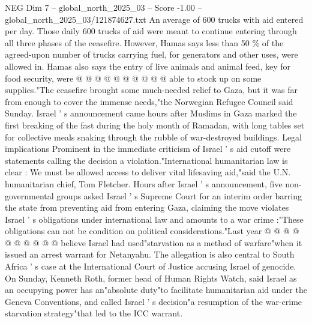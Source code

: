 \begin{textsample}{NEG Dim 7 – global\_north\_2025\_03 – Score -1.00 – global\_north\_2025\_03/121874627.txt}
An average of 600 trucks with aid entered per day.
Those daily 600 trucks of aid were meant to continue entering through all three phases of the ceasefire.
However, Hamas says less than 50 \% of the agreed-upon number of trucks carrying fuel, for generators and other uses, were allowed in.
Hamas also says the entry of live animals and animal feed, key for food security, were @ @ @ @ @ @ @ @ @ @ able to stock up on some supplies."The ceasefire brought some much-needed relief to Gaza, but it was far from enough to cover the immense needs,"the Norwegian Refugee Council said Sunday.
Israel ' s announcement came hours after Muslims in Gaza marked the first breaking of the fast during the holy month of Ramadan, with long tables set for collective meals snaking through the rubble of war-destroyed buildings.
Legal implications Prominent in the immediate criticism of Israel ' s aid cutoff were statements calling the decision a violation."International humanitarian law is clear : We must be allowed access to deliver vital lifesaving aid,"said the U.N. humanitarian chief, Tom Fletcher.
Hours after Israel ' s announcement, five non-governmental groups asked Israel ' s Supreme Court for an interim order barring the state from preventing aid from entering Gaza, claiming the move violates Israel ' s obligations under international law and amounts to a war crime :"These obligations can not be condition on political considerations."Last year @ @ @ @ @ @ @ @ @ @ believe Israel had used"starvation as a method of warfare"when it issued an arrest warrant for Netanyahu.
The allegation is also central to South Africa ' s case at the International Court of Justice accusing Israel of genocide.
On Sunday, Kenneth Roth, former head of Human Rights Watch, said Israel as an occupying power has an"absolute duty"to facilitate humanitarian aid under the Geneva Conventions, and called Israel ' s decision"a resumption of the war-crime starvation strategy"that led to the ICC warrant.

\end{textsample}

